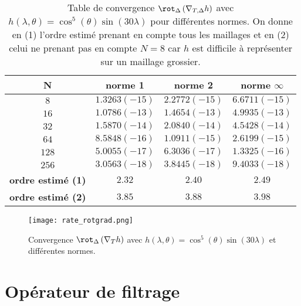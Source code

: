 \begin{table}[htbp]
\begin{center}
\begin{tabular}{|c||c|c|c|}
\hline
\textbf{N}  & \textbf{norme 1} & \textbf{norme 2} & \textbf{norme $\infty$} \\
\hline
\hline
$8$  & $1.3263(-15)$  & $2.2772(-15)$  & $6.6711(-15)$  \\
$16$ & $1.0786(-13)$  & $1.4654(-13)$  & $4.9935(-13)$  \\
$32$ & $1.5870(-14)$  & $2.0840(-14)$  & $4.5428(-14)$  \\
$64$ & $8.5848(-16)$  & $1.0911(-15)$  & $2.6199(-15)$  \\
$128$& $5.0055(-17)$  & $6.3036(-17)$  & $1.3325(-16)$  \\
$256$& $3.0563(-18)$  & $3.8445(-18)$  & $9.4033(-18)$ \\
\hline 
\hline
\textbf{ordre estimé (1)}& $2.32$ & $2.40$ & $2.49$\\
\hline
\hline
\textbf{ordre estimé (2)}& $3.85$ & $3.88$ & $3.98$\\
\hline
\end{tabular}
\end{center}
\caption{Table de convergence $\rot_{\Delta} \left(\nabla_{T,\Delta} h \right)$ avec $ h(\lambda,\theta) = \cos^5 (\theta) \sin(30 \lambda)$ pour différentes normes. On donne en (1) l'ordre estimé prenant en compte tous les maillages et en (2) celui ne prenant pas en compte $N=8$ car $h$ est difficile à représenter sur un maillage grossier.}
\label{tab:rate_rotgrad}
\end{table} 
\begin{figure}[htbp]
\begin{center}
\texttt{[image: rate\_rotgrad.png]}
\end{center}
\caption{Convergence $\rot_{\Delta} \left(\nabla_T h \right)$ avec $ h(\lambda,\theta) = \cos^5 (\theta) \sin(30 \lambda)$ et différentes normes.}
\label{fig:rate_rotgrad}
\end{figure}
















\section{Opérateur de filtrage}

